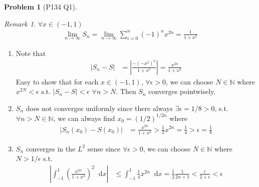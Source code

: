 \documentclass[twoside,11pt]{article}
\newcommand{\N}{\mathbb{N}}
\renewcommand*\d{\mathop{}\!\mathrm{d}}
\theoremstyle{definition}
\newtheorem{problem}{Problem}
\theoremstyle{remark}
\newtheorem*{remark}{Remark}
\begin{document}
\begin{problem}[P134 Q1]
\begin{remark}
$\forall x\in(-1, 1)$
\begin{align*}
    \lim_{n\rightarrow \infty} S_n = 
    \lim_{n\rightarrow \infty} \sum_{i=0}^n (-1)^n x^{2n} = 
    \frac{1}{1+x^2}
\end{align*}
\end{remark}
\begin{enumerate}[label=(\alph*)]
\item Note that
\begin{align*}
    |S_n - S| &= \left|\frac{- (-x^2)^n}{1+x^2}\right|
    = \frac{x^{2n}}{1 + x^2}
\end{align*}
Easy to show that for each $x\in (-1, 1)$, $\forall\epsilon>0$, we can choose 
$N\in\N$ where $x^{2N}<\epsilon$
s.t. $|S_n-S|<\epsilon$ $\forall n>N$.
Then $S_n$ converges pointwisely.

\item $S_n$ does not converges uniformly since there always $\exists\epsilon=1/8>0$,
s.t. $\forall n>N\in\N$, we can always find $x_0 = (1/2)^{1/2n}$ where
\begin{align*}
    |S_n(x_0) - S(x_0)| &=
    \frac{x^{2n}}{1 + x^2} > \frac{1}{2}x^{2n} 
    = \frac{1}{4} > \epsilon = \frac{1}{8}
\end{align*}

\item $S_n$ converges in the $L^2$ sense since $\forall\epsilon>0$, we can choose
$N\in\N$ where $N>1/\epsilon$ s.t. 
\begin{align*}
    \left|\int_{-1}^1 \left(
        \frac{x^{2n}}{1+x^2}
    \right)^2\d x\right|
    &\leq \int_{-1}^1 \frac{1}{4}x^{2n} \d x
    = \frac{1}{2}\frac{1}{2n+1} < \frac{\epsilon }{2+\epsilon } < \epsilon
\end{align*}


\end{enumerate}
\end{problem}
\end{document}
